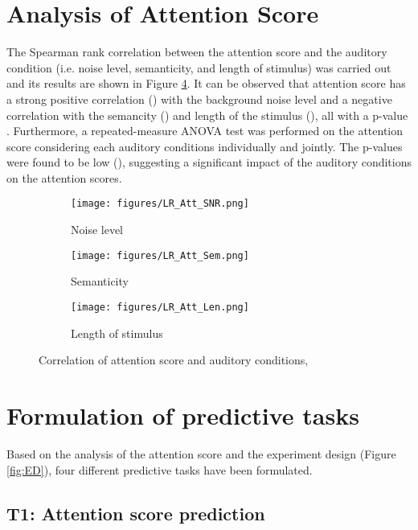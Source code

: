 \documentclass{article}
\begin{document}
\section{Analysis of Attention Score}
\label{S:AAtScore}
The Spearman rank correlation between the attention score and the auditory condition (i.e. noise level, semanticity, and length of stimulus) was carried out and its results are shown in Figure \ref{fig:att_score}. It can be observed that attention score has a strong positive correlation () with the background noise level and a negative correlation with the semancity () and length of the stimulus (), all with a p-value . Furthermore, a repeated-measure ANOVA test was performed on the attention score considering each auditory conditions individually and jointly. The p-values were found to be low (), suggesting a significant impact of the auditory conditions on the attention scores.

\begin{figure}[ht]
     \centering
     \begin{subfigure}[b]{0.39\textwidth}
         \centering
         \texttt{[image: figures/LR\_Att\_SNR.png]}
         \caption{Noise level}
         \label{fig:att_noise}
     \end{subfigure}
     \hfill
     \begin{subfigure}[b]{0.3\textwidth}
         \centering
         \texttt{[image: figures/LR\_Att\_Sem.png]}
         \caption{Semanticity}
         \label{fig:att_sem}
     \end{subfigure}
     \hfill
     \begin{subfigure}[b]{0.3\textwidth}
         \centering
         \texttt{[image: figures/LR\_Att\_Len.png]}
         \caption{Length of stimulus}
         \label{fig:att_len}
     \end{subfigure}
    \caption{Correlation of attention score and auditory conditions, }
    \label{fig:att_score}
\end{figure}

\section{Formulation of predictive tasks}
\label{S:pTasks}
Based on the analysis of the attention score and the experiment design (Figure \ref{fig:ED}), four different predictive tasks have been formulated. 

\subsection{\textbf{T1}: Attention score prediction}
\label{ss:T1}
\end{document}
